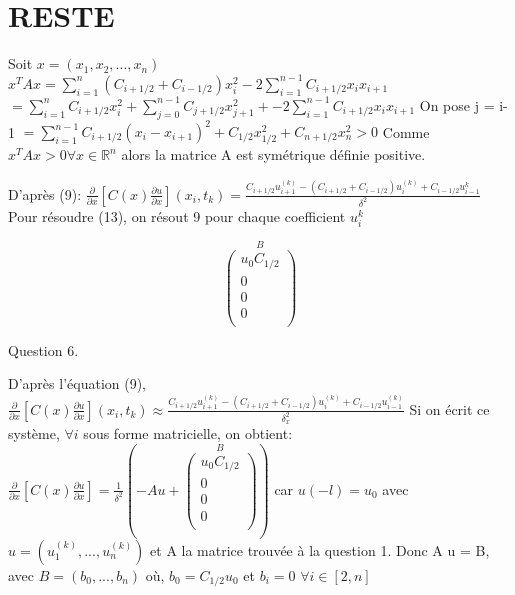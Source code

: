 \documentclass[a4paper,11pt]{article}
\newcommand{\R}{\mathbb{R}}
\theoremstyle{nonumberplain}
\theoremstyle{nonumberplain}
\theoremstyle{nonumberplain}
\begin{document}
    \section{RESTE}

    Soit $x = (x_1, x_2, ... , x_n)$
    \newline
    $x^TAx = \sum\limits_{i = 1}^{n} (C_{i+1/2} + C_{i-1/2}) x_i^2 - 2 \sum\limits_{i = 1}^{n-1} C_{i+1/2} x_i x_{i+1} $
    \newline
    $ = \sum\limits_{i = 1}^{n} C_{i+1/2} x_i^2 + \sum\limits_{j = 0}^{n-1} C_{j+1/2} x_{j+1}^2  + - 2 \sum\limits_{i = 1}^{n-1} C_{i+1/2} x_i x_{i+1} $ On pose j = i-1
    \newline
    $ = \sum\limits_{i = 1}^{n-1} C_{i+1/2} (x_i - x_{i+1})^2 + C_{1/2} x_{1/2}^2 + C_{n + 1/2} x_{n}^2 > 0 $
    \newline
    Comme $x^TAx > 0 \forall x \in \R ^n $ alors la matrice A est symétrique définie positive.
    \newline

    D'après (9):
    $ \frac{\partial}{\partial x}[C(x)\frac{\partial u}{\partial x}](x_i, t_k) = \frac{
    C_{i+1/2}u_{i+1}^{(k)} - (C_{i+1/2} + C_{i-1/2})u_i^{(k)}+C_{i-1/2}u_{i-1}^{k}}{\delta^{2}}$
    Pour résoudre (13), on résout 9 pour chaque coefficient $u_i^{k}$

    $$
    \overset{B} {
        \begin{pmatrix}
            u_0 C_{1/2} \\
            0 \\
            0 \\
            0 \\
        \end{pmatrix}
    }
    $$

    Question 6.

    D'après l'équation (9),
    \newline
    $ \frac{\partial }{\partial x} [C(x)\frac{\partial u }{\partial x}](x_i, t_k) \approx \frac{C_{i+1/2}u_{i+1}^{(k)} - (C_{i+1/2} + C_{i-1/2})u_i^{(k)} + C_{i-1/2}u_{i-1}^{(k)}}{\delta_x^2} $
    \newline
    Si on écrit ce système, $\forall i $ sous forme matricielle, on obtient:
    \newline
    $ \frac{\partial }{\partial x} [C(x)\frac{\partial u }{\partial x}] = \frac{1}{\delta ^2} (-A u +
    \overset{B} {
        \begin{pmatrix}
            u_0 C_{1/2} \\
            0 \\
            0 \\
            0 \\
        \end{pmatrix}
    })$
    car $u(-l) = u_0$
    avec $u = (u_1^{(k)}, ... , u_n^{(k)}) $
    et A la matrice trouvée à la question 1.
    \newline
    Donc A u = B, avec $B = (b_0, ..., b_n)$
    où, $b_0 = C_{1/2} u_0$
    et $b_i = 0$  $\forall i \in [2, n] $
    \newline
\end{document}

